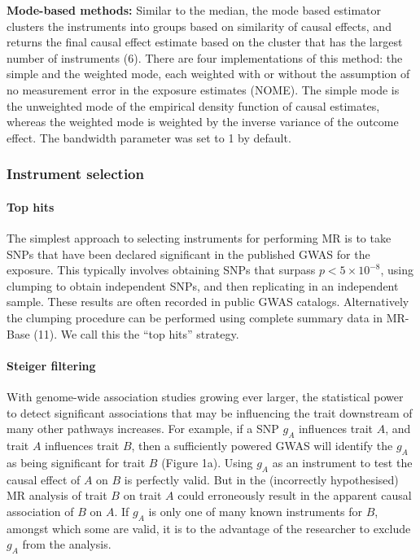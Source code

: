 \documentclass[]{article}
\let\oldparagraph\paragraph
\renewcommand{\paragraph}[1]{\oldparagraph{#1}\mbox{}}
\begin{document}
\textbf{Mode-based methods:} Similar to the median, the mode based
estimator clusters the instruments into groups based on similarity of
causal effects, and returns the final causal effect estimate based on
the cluster that has the largest number of instruments (6). There are
four implementations of this method: the simple and the weighted mode,
each weighted with or without the assumption of no measurement error in
the exposure estimates (NOME). The simple mode is the unweighted mode of
the empirical density function of causal estimates, whereas the weighted
mode is weighted by the inverse variance of the outcome effect. The
bandwidth parameter was set to 1 by default.

\subsubsection{Instrument selection}\label{instrument-selection}

\paragraph{Top hits}\label{top-hits}

The simplest approach to selecting instruments for performing MR is to
take SNPs that have been declared significant in the published GWAS for
the exposure. This typically involves obtaining SNPs that surpass
\(p < 5 \times 10^{-8}\), using clumping to obtain independent SNPs, and
then replicating in an independent sample. These results are often
recorded in public GWAS catalogs. Alternatively the clumping procedure
can be performed using complete summary data in MR-Base (11). We call
this the ``top hits'' strategy.

\paragraph{Steiger filtering}\label{steiger-filtering}

With genome-wide association studies growing ever larger, the
statistical power to detect significant associations that may be
influencing the trait downstream of many other pathways increases. For
example, if a SNP \(g_{A}\) influences trait \(A\), and trait \(A\)
influences trait \(B\), then a sufficiently powered GWAS will identify
the \(g_{A}\) as being significant for trait \(B\) (Figure 1a). Using
\(g_{A}\) as an instrument to test the causal effect of \(A\) on \(B\)
is perfectly valid. But in the (incorrectly hypothesised) MR analysis of
trait \(B\) on trait \(A\) could erroneously result in the apparent
causal association of \(B\) on \(A\). If \(g_{A}\) is only one of many
known instruments for \(B\), amongst which some are valid, it is to the
advantage of the researcher to exclude \(g_{A}\) from the analysis.
\end{document}
